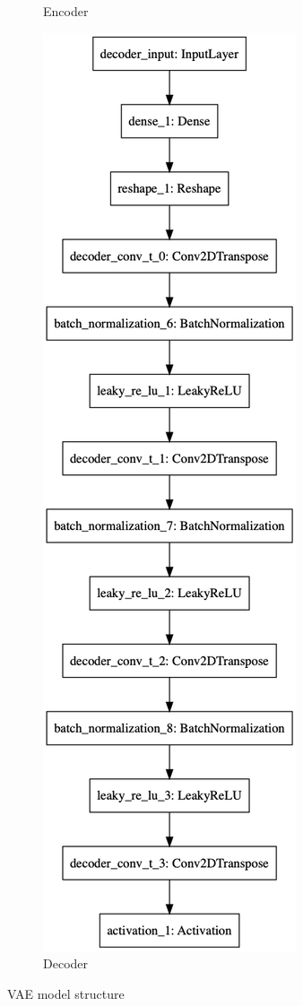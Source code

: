 \begin{figure}
\begin{subfigure}{.5\textwidth}
        \caption{Encoder}
    \end{subfigure}%
    \begin{subfigure}{.5\textwidth}
        \centering
        \includegraphics[width=\textwidth,height=.85\textheight,keepaspectratio]{images/vae/decoder.png}
        \caption{Decoder}
    \end{subfigure}
    \caption{VAE model structure}
    \label{fig:vae_model_structure}
\end{figure}

